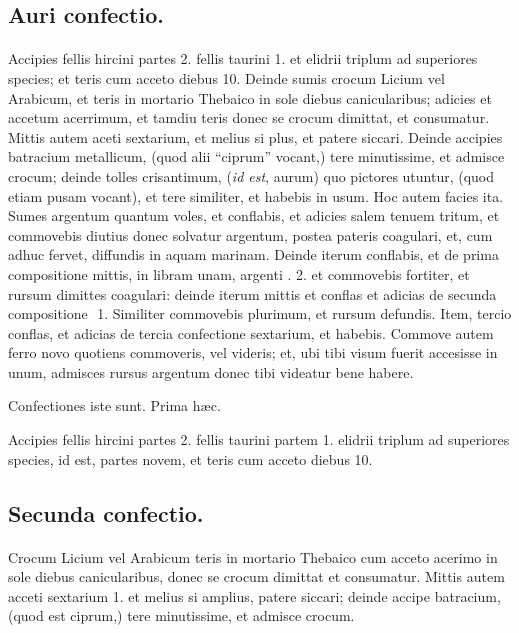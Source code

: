 \documentclass[a4paper, 11pt, oneside, polutonikogreek, italian]{article}
\newcommand*\svgaaa{}
\begin{document}
\subsection{Auri confectio.}
\paragraph{}
Accipies fellis hircini partes 2. fellis taurini 1. et elidrii triplum ad superiores species; et teris cum acceto diebus 10. Deinde sumis crocum Licium vel Arabicum, et teris in mortario Thebaico in sole diebus canicularibus; adicies et accetum acerrimum, et tamdiu teris donec se crocum dimittat, et consumatur. Mittis autem aceti sextarium, et melius si plus, et patere siccari. Deinde accipies batracium metallicum, (quod alii ``ciprum'' vocant,) tere minutissime, et admisce crocum; deinde tolles crisantimum, (\emph{id est}, aurum) quo pictores utuntur, (quod etiam pusam vocant), et tere similiter, et habebis in usum. Hoc autem facies ita. Sumes argentum quantum voles, et conflabis, et adicies salem tenuem tritum, et commovebis diutius donec solvatur argentum, postea pateris coagulari, et, cum adhuc fervet, diffundis in aquam marinam. Deinde iterum conflabis, et de prima compositione mittis, in libram unam, argenti \roundz. 2. et commovebis fortiter, et rursum dimittes coagulari: deinde iterum mittis et conflas et adicias de secunda compositione $\svgaaa$ 1. Similiter commovebis plurimum, et rursum defundis. Item, tercio conflas, et adicias de tercia confectione sextarium, et habebis. Commove autem ferro novo quotiens commoveris, vel videris; et, ubi tibi visum fuerit accesisse in unum, admisces rursus argentum donec tibi videatur bene habere.

Confectiones iste sunt. Prima hæc.

Accipies fellis hircini partes 2. fellis taurini partem 1. elidrii triplum ad superiores species, id est, partes novem, et teris cum acceto diebus 10.

\subsection{Secunda confectio.}
\paragraph{}
Crocum Licium vel Arabicum teris in mortario Thebaico cum acceto acerimo in sole diebus canicularibus, donec se crocum dimittat et consumatur. Mittis autem acceti sextarium 1. et melius si amplius, patere siccari; deinde accipe batracium, (quod est ciprum,) tere minutissime, et admisce crocum.
\end{document}
